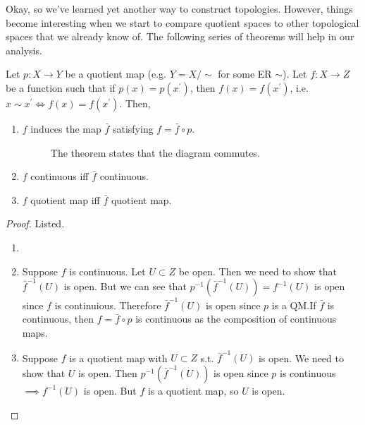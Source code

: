     Okay, so we've learned yet another way to construct topologies. However, things become interesting when we start to compare quotient spaces to other topological spaces that we already know of. The following series of theorems will help in our analysis. 

    \begin{theorem}
      Let $p: X \rightarrow Y$ be a quotient map (e.g. $Y = X/\sim$ for some ER $\sim$). Let $f: X \rightarrow Z$ be a function such that if $p(x) = p(x^\prime)$, then $f(x) = f(x^\prime)$, i.e. $x \sim x^\prime \iff f(x) = f(x^\prime)$. Then, 
      \begin{enumerate}
        \item $f$ induces the map $\bar{f}$ satisfying $f = \bar{f} \circ p$. 

        \begin{figure}[H]
          \centering 
          \caption{The theorem states that the diagram commutes. } 
          \label{fig:quotient_continuity}
        \end{figure}

        \item $f$ continuous iff $\bar{f}$ continuous. 
        \item $f$ quotient map iff $\bar{f}$ quotient map. 
      \end{enumerate}
    \end{theorem}
    \begin{proof}
      Listed. 
      \begin{enumerate}
        \item 
        \item Suppose $f$ is continuous. Let $U \subset Z$ be open. Then we need to show that $\bar{f}^{-1} (U)$ is open. But we can see that $p^{-1} (\bar{f}^{-1}(U)) = f^{-1} (U)$ is open since $f$ is continuious. Therefore $\bar{f}^{-1} (U)$ is open since $p$ is a QM.If $\bar{f}$ is continuous, then $f = \bar{f} \circ p$ is continuous as the composition of continuous maps. 
        \item Suppose $f$ is a quotient map with $U \subset Z$ s.t. $\bar{f}^{-1} (U)$ is open. We need to show that $U$ is open. Then $p^{-1} (\bar{f}^{-1} (U))$ is open since $p$ is continuous $\implies f^{-1} (U)$ is open. But $f$ is a quotient map, so $U$ is open. 
      \end{enumerate}
    \end{proof}

